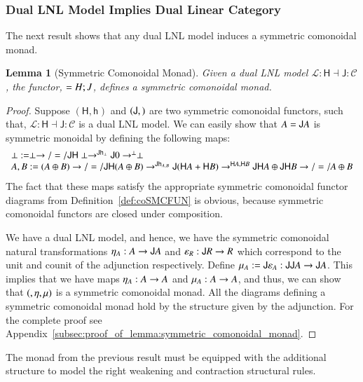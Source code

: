 \documentclass{lmcs}
\newtheorem{lemma}[theorem]{Lemma}
\let\mto\to
\let\to\relax
\newcommand{\to}{\rightarrow}
\let\r\relax
\let\j\relax
\let\wn\relax
\let\H\relax
\newcommand{\cat}[1]{\mathcal{#1}}
\newcommand{\func}[1]{\mathsf{#1}}
\newcommand{\H}[0]{\func{H}}
\newcommand{\J}[0]{\func{J}}
\newcommand{\h}[1]{\mathsf{h}_{#1}}
\newcommand{\r}[1]{\mathsf{r}_{#1}}
\newcommand{\j}[1]{\mathsf{j}_{#1}}
\newcommand{\wn}[0]{\mathop{?}}
\begin{document}
\subsubsection{Dual LNL Model Implies Dual Linear Category}
\label{subsec:dual_lnl_model_implies_dual_category}

The next result shows that any dual LNL model induces a symmetric
comonoidal monad.
\begin{lemma}[Symmetric Comonoidal Monad]
  \label{lemma:symmetric_comonoidal_monad}
  Given a dual LNL model $\cat{L} : \func{H} \dashv \func{J} : \cat{C}$,
  the functor, $\wn = H;J$, defines a symmetric comonoidal monad.
\end{lemma}
\begin{proof}
  Suppose $(\func{H},\h{})$ and $(\func{J},\j{})$ are two symmetric
  comonoidal functors, such that, $\cat{L} : \func{H} \dashv \func{J}
  : \cat{C}$ is a dual LNL model.  We can easily show that $\wn A = \J\H
  A$ is symmetric monoidal by defining the following maps:
  \[
  \begin{array}{lll}
    \r{\perp} := \wn \perp \mto/=/ \func{JH}\perp \mto^{\func{J}\h{\perp}} \func{J}0 \mto^{\j{\perp}} \perp\\
    \r{A,B} := \wn (A \oplus B) \mto/=/ \func{JH}(A \oplus B) \mto^{\func{J}\h{A,B}} \func{J}(\func{H}A + \func{H}B) \mto^{\j{\func{H}A,\func{H}B}} \func{JH}A \oplus \func{JH}B \mto/=/ \wn A \oplus \wn B\\
  \end{array}
  \]
  The fact that these maps satisfy the appropriate symmetric
  comonoidal functor diagrams from Definition~\ref{def:coSMCFUN} is
  obvious, because symmetric comonoidal functors are closed under
  composition.  

  We have a dual LNL model, and hence, we have the symmetric comonoidal
  natural transformations $\eta_A : A \mto \J\H A$ and $\varepsilon_R
  : \H\J R \mto R$ which correspond to the unit and counit of the
  adjunction respectively.  Define $\mu_A := \J\varepsilon_{\H A} :
  \J\H\J\H A \mto \J\H A$.  This implies that we have maps $\eta_A : A
  \mto \wn A$ and $\mu_A : \wn\wn A \mto \wn A$, and thus, we can show
  that $(\wn, \eta, \mu)$ is a symmetric comonoidal monad.  All
  the diagrams defining a symmetric comonoidal monad hold by the
  structure given by the adjunction.  For the complete proof see
  Appendix~\ref{subsec:proof_of_lemma:symmetric_comonoidal_monad}.
\end{proof}

The monad from the previous result must be equipped with the
additional structure to model the right weakening and contraction
structural rules.
\end{document}
